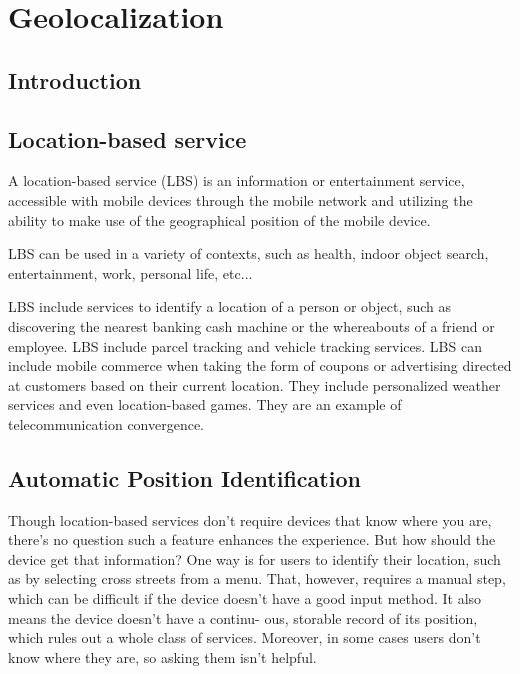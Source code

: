 
\section{Geolocalization}
\subsection{Introduction}
\subsection{Location-based service}
A location-based service (LBS) is an information or entertainment service,
accessible with mobile devices through the mobile network and utilizing the
ability to make use of the geographical position of the mobile device.

LBS can be used in a variety of contexts, such as health, indoor object search,
entertainment, work, personal life, etc...
\cite{geolocation:wikipidea:geomarketing}

LBS include services to identify a location of a person or object, such as
discovering the nearest banking cash machine or the whereabouts of a friend or
employee. LBS include parcel tracking and vehicle tracking services. LBS can
include mobile commerce when taking the form of coupons or advertising directed
at customers based on their current location. They include personalized weather
services and even location-based games. They are an example of telecommunication
convergence.
\cite{geolocation:wikipidea:lbs}

\subsection{Automatic Position Identification}
Though location-based services don’t require devices that know where you are,
there’s no question such a feature enhances the experience. But how should the
device get that information? One way is for users to identify their location,
such as by selecting cross streets from a menu. That, however, requires a manual
step, which can be difficult if the device doesn’t have a good input method. It
also means the device doesn’t have a continu- ous, storable record of its
position, which rules out a whole class of services. Moreover, in some cases
users don’t know where they are, so asking them isn’t helpful.

